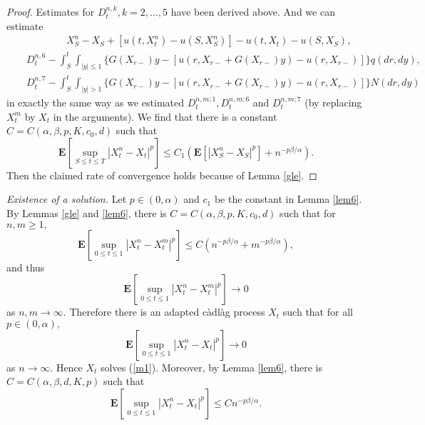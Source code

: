 \documentclass[11pt]{amsart}
\theoremstyle{plain}
\numberwithin{equation}{section}
\begin{document}
\begin{proof}
Estimates for $D_{t}^{n,k},k=2,\ldots ,5$ have been derived above. And we
can estimate 
\begin{eqnarray*}
&&\qquad \qquad X_{S}^{n}-X_{S}+[u\left( t,X_{t}^{n}\right) -u\left(
S,X_{S}^{n}\right) ]-u\left( t,X_{t}\right) -u\left( S,X_{S}\right) , \\
&&D_{t}^{n,6}-\int_{S}^{t}\int_{\left\vert y\right\vert \leq 1}\{G\left(
X_{r-}\right) y-\left[ u\left( r,X_{r-}+G\left( X_{r-}\right) y\right)
-u\left( r,X_{r-}\right) \right] \}q\left( dr,dy\right) , \\
&&D_{t}^{n,7}-\int_{S}^{t}\int_{\left\vert y\right\vert >1}\{G\left(
X_{r-}\right) y-\left[ u\left( r,X_{r-}+G\left( X_{r-}\right) y\right)
-u\left( r,X_{r-}\right) \right] \}N\left( dr,dy\right)
\end{eqnarray*}in exactly the same way as we estimated $D_{t}^{n,m;1},D_{t}^{n,m;6}$ and $D_{t}^{n,m;7}$ (by replacing $X_{t}^{m}$ by $X_{t}$ in the arguments). We
find that there is a constant $C=C\left( \alpha ,\beta ,p,K,c_{0},d\right) $
such that\begin{equation*}
\mathbf{E}\left[ \sup_{S\leq t\leq T}\left\vert X_{t}^{n}-X_{t}\right\vert
^{p}\right] \leq C_{1}\left( \mathbf{E}\left[ \left\vert
X_{S}^{n}-X_{S}\right\vert ^{p}\right] +n^{-p\beta /\alpha }\right) .
\end{equation*}Then the claimed rate of convergence holds because of Lemma \ref{gle}.
\end{proof}

\emph{Existence of a solution.} Let $p\in (0,\alpha )$ and $c_{1}$ be the
constant in Lemma \ref{lem6}. By Lemmas \ref{gle} and \ref{lem6}, there is $C=C\left( \alpha ,\beta ,p,K,c_{0},d\right) $ such that for $n,m\geq 1,$\begin{equation*}
\mathbf{E}\left[ \sup_{0\leq t\leq 1}\left\vert
X_{t}^{n}-X_{t}^{m}\right\vert ^{p}\right] \leq C\left( n^{-p\beta /\alpha
}+m^{-p\beta /\alpha }\right) ,
\end{equation*}and thus 
\begin{equation*}
\mathbf{E}\left[ \sup_{0\leq t\leq 1}\left\vert
X_{t}^{n}-X_{t}^{m}\right\vert ^{p}\right] \rightarrow 0
\end{equation*}as $n,m\rightarrow \infty $. Therefore there is an adapted c\`{a}dl\`{a}g
process $X_{t}$ such that for all $p\in \left( 0,\alpha \right) ,$\begin{equation*}
\mathbf{E}\left[ \sup_{0\leq t\leq 1}\left\vert X_{t}^{n}-X_{t}\right\vert
^{p}\right] \rightarrow 0
\end{equation*}as $n\rightarrow \infty $. Hence $X_{t}$ solves (\ref{m1}). Moreover, by
Lemma \ref{lem6}, there is $C=C\left( \alpha ,\beta ,d,K,p\right) $ such
that 
\begin{equation*}
\mathbf{E}\left[ \sup_{0\leq t\leq 1}\left\vert X_{t}^{n}-X_{t}\right\vert
^{p}\right] \leq Cn^{-p\beta /\alpha }.
\end{equation*}
\end{document}
